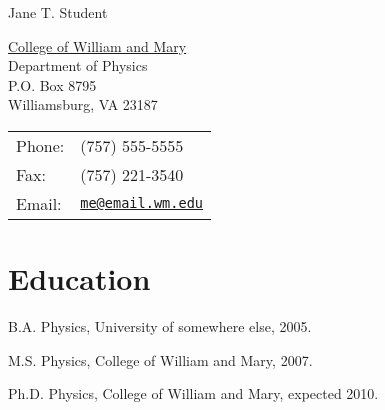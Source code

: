 \documentclass[letterpaper,10pt]{article}
\def\name{Jane T. Student}
\renewenvironment{itemize}{
  \begin{list}{}{
    \setlength{\leftmargin}{1.5em}
  }
}{
  \end{list}
}
\begin{document}
{\huge \name}


\vspace{0.25in}

\begin{minipage}{0.45\linewidth}
  \href{http://www.wm.edu/}{College of William and Mary} \\
  Department of Physics \\
  P.O. Box 8795 \\
  Williamsburg, VA 23187
\end{minipage}
\begin{minipage}{0.45\linewidth}
  \begin{tabular}{ll}
    Phone: & (757) 555-5555 \\
    Fax: &  (757) 221-3540 \\
    Email: & \href{mailto:me@email.wm.edu}{\tt me@email.wm.edu} \\
  \end{tabular}
\end{minipage}

\section*{Education}

\begin{itemize}
  \item B.A. Physics, University of somewhere else, 2005.

  \item M.S. Physics, College of William and Mary, 2007.

  \item Ph.D. Physics, College of William and Mary, expected 2010.
\end{itemize}

\end{document}
